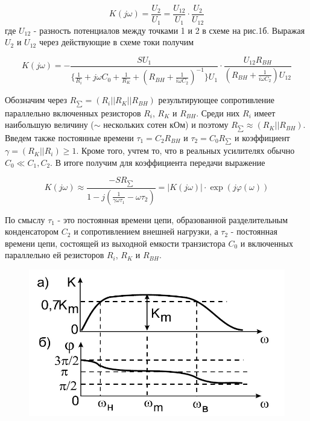$$K(j\omega)=\frac{U_2}{U_1}=\frac{U_{12}}{U_1} \cdot \frac{U_2}{U_{12}}$$
где $U_{12}$ - разность потенциалов между точками 1 и 2 в схеме на рис.1б. Выражая $U_2$ и $U_{12}$ через действующие в схеме токи получим

$$K(j\omega)=-\frac{SU_1}{\{\frac{1}{R_i}+j\omega C_0+\frac{1}{R_K}+(R_{BH}+\frac{1}{i\omega C_2})^{-1}\}U_1} \cdot \frac{U_{12}R_{BH}}{(R_{BH}+\frac{1}{i\omega C_2})U_{12}}$$

Обозначим через $R_{\sum}=(R_i||R_K||R_{BH})$ результирующее сопротивление параллельно включенных резисторов $R_i$, $R_K$ и $R_{BH}$. Среди них $R_i$ имеет наибольшую величину ($\sim$ нескольких сотен кОм) и поэтому $R_{\sum} \approx (R_K||R_{BH})$. Введем также постоянные времени $\tau_1=C_2 R_{BH}$ и $\tau_2=C_0 R_{\sum}$ и коэффициент $\gamma=(R_K||R_i)\geq 1$. Кроме того, учтем то, что в реальных усилителях обычно $C_0 \ll C_1,C_2$. В итоге получим для коэффициента передачи выражение

\begin{equation}
	K(j\omega) \approx \frac{-SR_{\sum}}{1-j(\frac{1}{\gamma \omega \tau_1}-\omega \tau_2)}=|K(j \omega)| \cdot \exp(j \varphi(\omega))
	\label{eq:3}
\end{equation}

По смыслу $\tau_1$ - это постоянная времени цепи, образованной разделительным конденсатором $C_2$ и сопротивлением внешней нагрузки, а $\tau_2$ - постоянная времени цепи, состоящей из выходной емкости транзистора $C_0$ и включенных параллельно ей  резисторов $R_i$, $R_K$ и $R_{BH}$.

\begin{figure}[h!]
	\centering
	\includegraphics[width=0.6\linewidth]{fig/fig5}
	\caption{}
	\label{fig:5}
\end{figure}

